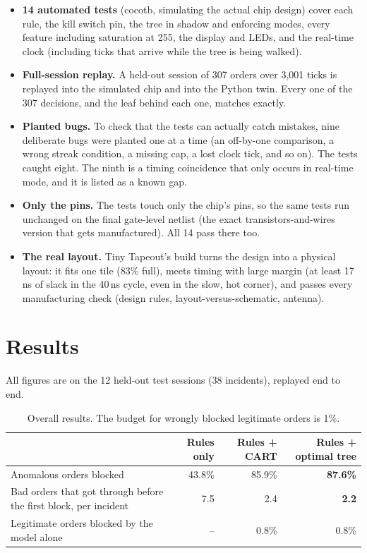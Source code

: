 \documentclass[11pt,a4paper]{article}
\begin{document}
\begin{itemize}
  \item \textbf{14 automated tests} (cocotb, simulating the actual chip design) cover each rule,
        the kill switch pin, the tree in shadow and enforcing modes, every feature including
        saturation at 255, the display and LEDs, and the real-time clock (including ticks that arrive while the tree is being walked).
  \item \textbf{Full-session replay.} A held-out session of 307 orders over 3{,}001 ticks is
        replayed into the simulated chip and into the Python twin. Every one of the 307 decisions,
        and the leaf behind each one, matches exactly.
  \item \textbf{Planted bugs.} To check that the tests can actually catch mistakes, nine
        deliberate bugs were planted one at a time (an off-by-one comparison, a wrong streak
        condition, a missing cap, a lost clock tick, and so on). The tests caught eight. The ninth is a timing
        coincidence that only occurs in real-time mode, and it is listed as a known gap.
  \item \textbf{Only the pins.} The tests touch only the chip's pins, so the same tests run
        unchanged on the final gate-level netlist (the exact transistors-and-wires version that
        gets manufactured). All 14 pass there too.
  \item \textbf{The real layout.} Tiny Tapeout's build turns the design into a physical layout:
        it fits one tile (83\% full), meets timing with large margin (at least 17\,ns of slack
        in the 40\,ns cycle, even in the slow, hot corner), and passes every manufacturing check
        (design rules, layout-versus-schematic, antenna).
\end{itemize}

\section{Results}

All figures are on the 12 held-out test sessions (38 incidents), replayed end to end.

\begin{table}[h]
\centering\small
\begin{tabularx}{\linewidth}{@{}Xrrr@{}}
\toprule
& Rules only & Rules + CART & \textbf{Rules + optimal tree} \\
\midrule
Anomalous orders blocked & 43.8\% & 85.9\% & \textbf{87.6\%} \\
Bad orders that got through before the first block, per incident & 7.5 & 2.4 & \textbf{2.2} \\
Legitimate orders blocked by the model alone & -- & 0.8\% & 0.8\% \\
\bottomrule
\end{tabularx}
\caption{Overall results. The budget for wrongly blocked legitimate orders is 1\%.}
\end{table}
\end{document}
